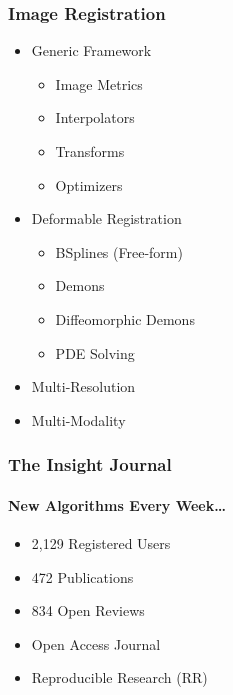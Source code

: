 \begin{frame}
\frametitle{Image Registration}
\begin{itemize}
\item Generic Framework
\pause
\begin{itemize}
\item Image Metrics
\item Interpolators
\item Transforms
\item Optimizers
\end{itemize}
\pause
\item Deformable Registration
\pause
\begin{itemize}
\item BSplines (Free-form)
\item Demons
\item Diffeomorphic Demons
\item PDE Solving
\end{itemize}
\pause
\item Multi-Resolution
\pause
\item Multi-Modality
\end{itemize}
\end{frame}

\begin{frame}
\frametitle{The Insight Journal}
\framesubtitle{New Algorithms Every Week\ldots}
\begin{itemize}
\item 2,129 Registered Users
\pause
\item 472 Publications
\pause
\item 834 Open Reviews
\pause
\item Open Access Journal
\pause
\item Reproducible Research (RR)
\end{itemize}
\end{frame}

